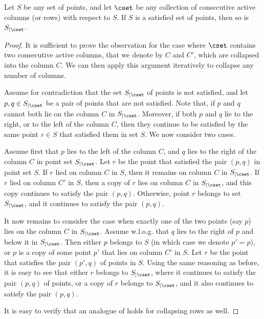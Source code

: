 \begin{myobs}\label{obs: collapsing columns}
Let $S$ be any set of points, and let $\cset$ be any collection of consecutive active columns (or rows) with respect to $S$. If $S$ is a satisfied set of points, then so is $S_{|\cset}$.
\end{myobs}
\begin{proof}
It is sufficient to prove the observation for the case where $\cset$ contains two consecutive active columns, that we denote by $C$ and $C'$, which are collapsed into the column $C$. We can then apply this argument iteratively to collapse any number of columns.

Assume for contradiction that the set $S_{|\cset}$ of points is not satisfied, and let $p,q\in S_{|\cset}$ be a pair of points that are not satisfied. Note that, if $p$ and $q$ cannot both lie on the column $C$ in $S_{|\cset}$. Moreover, if both $p$ and $q$ lie to the right, or to the left of the column $C$, then they continue to be satisfied by the same point $r\in S$ that satisfied them in set $S$. We now consider two cases.

Assume first that $p$ lies to the left of the column $C$, and $q$ lies to the right of the column $C$ in point set $S_{|\cset}$. Let $r$ be the point that satisfied the pair $(p,q)$ in point set $S$. If $r$ lied on column $C$ in $S$, then it remains on column $C$ in $S_{|\cset}$. If $r$ lied on column $C'$ in $S$, then a copy of $r$ lies on column $C$ in $S_{|\cset}$, and this copy continues to satisfy the pair $(p,q)$. Otherwise, point $r$ belongs to set $S_{|\cset}$, and it continues to satisfy the pair $(p,q)$.

It now remains to consider the case when exactly one of the two points (say $p$) lies on the column $C$ in $S_{|\cset}$. Assume w.l.o.g. that $q$ lies to the right of $p$ and below it in $S_{|\cset}$. Then either $p$ belongs to $S$ (in which case we denote $p'=p$), or $p$ is a copy of some point $p'$ that lies on column $C'$ in $S$. Let $r$ be the point that satisfies the pair $(p',q)$ of points in $S$. Using the same reasoning as before, it is easy to see that either $r$ belongs to $S_{|\cset}$, where it continues to satisfy the pair $(p,q)$ of points, or  a copy of $r$ belongs to $S_{|\cset}$, and it also continues to satisfy the pair $(p,q)$.

It is easy to verify that an analogue of  holds for collapsing rows as well.
\end{proof}

